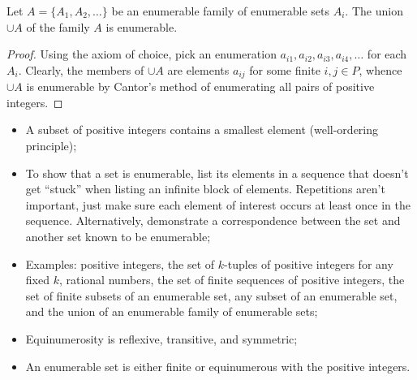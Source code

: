\begin{exercise}[1.7]
  Let $A = \{A_1, A_2, \ldots\}$ be an enumerable family of enumerable sets $A_i$.
  The union $\cup A$ of the family $A$ is enumerable.
\end{exercise}
\begin{proof}
  Using the axiom of choice, pick an enumeration $a_{i1}, a_{i2}, a_{i3}, a_{i4}, \ldots$ for each $A_i$.
  Clearly, the members of $\cup A$ are elements $a_{ij}$ for some finite $i,j \in P$, whence $\cup A$ is enumerable by Cantor's method of enumerating all pairs of positive integers.
\end{proof}

\begin{summary}
  \begin{itemize}
    \item A subset of positive integers contains a smallest element (well-ordering principle);
    \item To show that a set is enumerable, list its elements in a sequence that doesn't get ``stuck'' when listing an infinite block of elements.
    Repetitions aren't important, just make sure each element of interest occurs at least once in the sequence.
    Alternatively, demonstrate a correspondence between the set and another set known to be enumerable;
    \item Examples: positive integers, the set of $k$-tuples of positive integers for any fixed $k$, rational numbers, the set of finite sequences of positive integers, the set of finite subsets of an enumerable set, any subset of an enumerable set, and the union of an enumerable family of enumerable sets;
    \item Equinumerosity is reflexive, transitive, and symmetric;
    \item An enumerable set is either finite or equinumerous with the positive integers.
  \end{itemize}
\end{summary}
